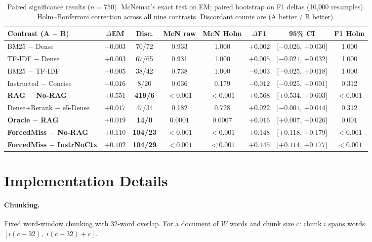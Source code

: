 \documentclass{article}
\begin{document}
\begin{table}[h]
\centering
\caption{Paired significance results ($n\!=\!750$). McNemar's exact
  test on EM; paired bootstrap on F1 deltas (10{,}000 resamples).
  Holm--Bonferroni correction across all nine contrasts. Discordant
  counts are (A better / B better).}
\label{tab:sig}
\small
\setlength{\tabcolsep}{4pt}
\begin{tabular}{lccccccc}
\toprule
Contrast (A $-$ B) & $\Delta$EM & Disc. &
  McN raw & \textbf{McN Holm} &
  $\Delta$F1 & 95\% CI & \textbf{F1 Holm} \\
\midrule
BM25 $-$ Dense & $-0.003$ & 70/72 & 0.933 & 1.000 &
  $+0.002$ & [$-0.026$, $+0.030$] & 1.000 \\
TF-IDF $-$ Dense & $+0.003$ & 67/65 & 0.931 & 1.000 &
  $+0.005$ & [$-0.021$, $+0.032$] & 1.000 \\
BM25 $-$ TF-IDF & $-0.005$ & 38/42 & 0.738 & 1.000 &
  $-0.003$ & [$-0.025$, $+0.018$] & 1.000 \\
Instructed $-$ Concise & $-0.016$ & 8/20 & 0.036 & 0.179 &
  $-0.012$ & [$-0.025$, $+0.001$] & 0.312 \\
\textbf{RAG $-$ No-RAG} & $\mathbf{+0.551}$ & \textbf{419/6} &
  $\mathbf{<0.001}$ & $\mathbf{<0.001}$ &
  $+0.568$ & [$+0.534$, $+0.603$] & $<0.001$ \\
Dense+Rerank $-$ e5-Dense & $+0.017$ & 47/34 & 0.182 & 0.728 &
  $+0.022$ & [$-0.001$, $+0.044$] & 0.312 \\
\textbf{Oracle $-$ RAG} & $\mathbf{+0.019}$ & \textbf{14/0} &
  $\mathbf{0.0001}$ & $\mathbf{0.0007}$ &
  $+0.016$ & [$+0.007$, $+0.026$] & $0.001$ \\
\textbf{ForcedMiss $-$ No-RAG} & $\mathbf{+0.110}$ & \textbf{104/23} &
  $\mathbf{<0.001}$ & $\mathbf{<0.001}$ &
  $+0.148$ & [$+0.118$, $+0.179$] & $<0.001$ \\
\textbf{ForcedMiss $-$ InstrNoCtx} & $\mathbf{+0.102}$ & \textbf{104/29} &
  $\mathbf{<0.001}$ & $\mathbf{<0.001}$ &
  $+0.145$ & [$+0.114$, $+0.177$] & $<0.001$ \\
\bottomrule
\end{tabular}
\end{table}

\section{Implementation Details}

\paragraph{Chunking.}
Fixed word-window chunking with 32-word overlap.
For a document of $W$ words and chunk size $c$:
chunk $i$ spans words $[i(c-32),\; i(c-32)+c]$.
\end{document}
